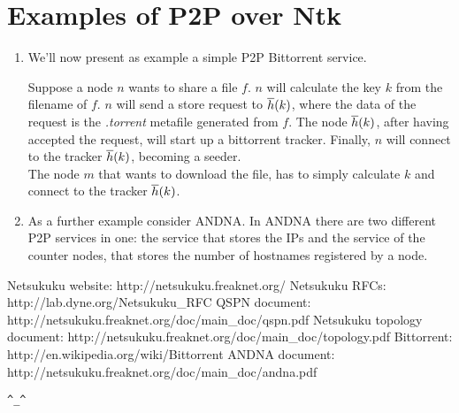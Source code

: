 \documentclass[a4paper]{article}
\newcommand{\href}[2]{ #1 }
\theoremstyle{definition}
\begin{document}
\section{Examples of P2P over Ntk}
\begin{enumerate}
	\item 
We'll now present as example a simple P2P Bittorrent\cite{bittorrent}
service.\\\newline

Suppose a node $n$ wants to share a file $f$.
$n$ will calculate the key $k$ from the filename of $f$. 
$n$ will send a store request to ${{\overline{h}}}(k)$, where the data of the
request is the \emph{.torrent} metafile generated from $f$.
The node ${{\overline{h}}}(k)$, after having accepted the request, will start up a
bittorrent tracker.
Finally, $n$ will connect to the tracker ${{\overline{h}}}(k)$, becoming a seeder.\\\newline
The node $m$ that wants to download the file, has to simply calculate $k$ and 
connect to the tracker ${{\overline{h}}}(k)$.
\item As a further example consider ANDNA\cite{andnadoc}. In ANDNA there are
	two different P2P services in one: the service that stores the IPs and
	the service of the counter nodes, that stores the number of
	hostnames registered by a node.
\end{enumerate}


\begin{thebibliography}{99}
	 Netsukuku website:
		\href{http://netsukuku.freaknet.org/}{http://netsukuku.freaknet.org/}
	 Netsukuku RFCs:
		\href{http://lab.dyne.org/Netsukuku\_RFC}{NTK RFCs}
	 QSPN document:
		\href{http://netsukuku.freaknet.org/doc/main\_doc/qspn.pdf}{qspn.pdf}
	 Netsukuku topology document:
		\href{http://netsukuku.freaknet.org/doc/main\_doc/topology.pdf}{topology.pdf}
	 Bittorrent:
		\href{http://en.wikipedia.org/wiki/Bittorrent}{Bittorrent}
	 ANDNA document:
		\href{http://netsukuku.freaknet.org/doc/main\_doc/andna.pdf}{andna.pdf}
\end{thebibliography}
\newpage

\begin{center}
\verb|^_^|
\end{center}
\end{document}
